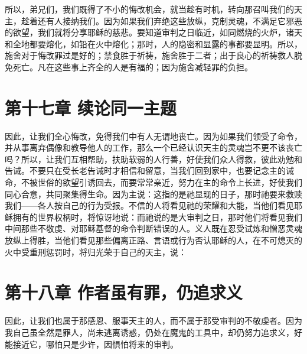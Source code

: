 所以，弟兄们，我们既得了不小的悔改机会，就当趁有时机，转向那召叫我们的天主，趁着还有人接纳我们。因为如果我们弃绝这些放纵，克制灵魂，不满足它邪恶的欲望，我们就将分享耶稣的慈悲。要知道审判之日临近，如同燃烧的火炉，诸天和全地都要熔化，如铅在火中熔化；那时，人的隐密和显露的事都要显明。所以，施舍对于悔改罪过是好的；禁食胜于祈祷，施舍胜于二者；出于良心的祈祷救人脱免死亡。凡在这些事上齐全的人是有福的；因为施舍减轻罪的负担。\par


\section{第十七章 续论同一主题}

因此，让我们全心悔改，免得我们中有人无谓地丧亡。因为如果我们领受了命令，并从事离弃偶像和教导他人的工作，那么一个已经认识天主的灵魂岂不更不该丧亡吗？所以，让我们互相帮助，扶助软弱的人行善，好使我们众人得救，彼此劝勉和告诫。不要只在受长老告诫时才相信和留意，当我们回到家中，也要记念主的诫命，不被世俗的欲望引诱回去，而要常常亲近，努力在主的命令上长进，好使我们同心合意，共同聚集得生命。因为主说：这指的是祂显现的日子，那时祂要来救赎我们——各人按自己的行为受报。不信的人将看见祂的荣耀和大能，当他们看见耶稣拥有的世界权柄时，将惊讶地说：而祂说的是大审判之日，那时他们将看见我们中间那些不敬虔、对耶稣基督的命令判断错误的人。义人既在忍受试炼和憎恶灵魂放纵上得胜，当他们看见那些偏离正路、言语或行为否认耶稣的人，在不可熄灭的火中受重刑惩罚时，将归光荣于自己的天主，说：\par


\section{第十八章 作者虽有罪，仍追求义}

因此，让我们也属于那感恩、服事天主的人，而不属于那受审判的不敬虔者。因为我自己虽全然是罪人，尚未逃离诱惑，仍处在魔鬼的工具中，却仍努力追求义，好能接近它，哪怕只是少许，因惧怕将来的审判。\par

